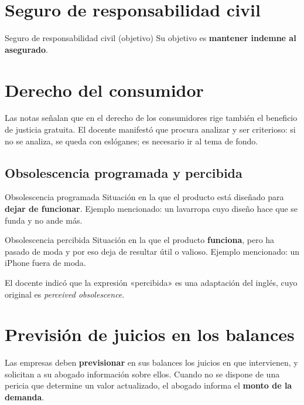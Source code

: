 \documentclass[12pt,oneside]{book}
\begin{document}
\section{Seguro de responsabilidad civil}

\begin{definition}{Seguro de responsabilidad civil (objetivo)}
Su objetivo es \textbf{mantener indemne al asegurado}.
\end{definition}

\section{Derecho del consumidor}

Las notas señalan que en el derecho de los consumidores rige también el beneficio de justicia gratuita.
El docente manifestó que procura analizar y ser criterioso: si no se analiza, se queda con eslóganes; es necesario ir al tema de fondo.

\subsection{Obsolescencia programada y percibida}

\begin{definition}{Obsolescencia programada}
Situación en la que el producto está diseñado para \textbf{dejar de funcionar}. Ejemplo mencionado: un lavarropa cuyo diseño hace que se funda y no ande más.
\end{definition}

\begin{definition}{Obsolescencia percibida}
Situación en la que el producto \textbf{funciona}, pero ha pasado de moda y por eso deja de resultar útil o valioso. Ejemplo mencionado: un iPhone fuera de moda.
\end{definition}

El docente indicó que la expresión «percibida» es una adaptación del inglés, cuyo original es \emph{perceived obsolescence}.

\section{Previsión de juicios en los balances}

Las empresas deben \textbf{previsionar} en sus balances los juicios en que intervienen, y solicitan a su abogado información sobre ellos. Cuando no se dispone de una pericia que determine un valor actualizado, el abogado informa el \textbf{monto de la demanda}.
\end{document}
